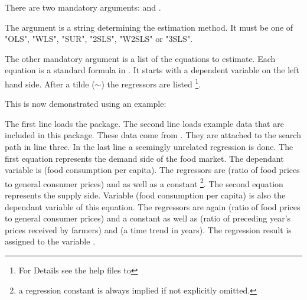 \documentclass[article]{jss}
\begin{document}
There are two mandatory arguments:  and .

The argument  is a string determining the estimation method.
It must be one of "OLS", "WLS", "SUR", "2SLS", "W2SLS" or "3SLS".

The other mandatory argument  is a list of the equations 
to estimate. 
Each equation is a standard formula in .
It starts with a dependent variable on the left hand side.
After a tilde ($\sim$) the regressors are listed%
\footnote{For Details see the  help files to }.

This is now demonstrated using an example: \\

The first line loads the  package. 
The second line loads example data that are included in this package.
These data come from \cite{kmenta86}.
They are attached to the  search path in line three.
In the last line a seemingly unrelated regression is done.
The first equation represents the demand side of the food market.
The dependant variable is  (food consumption per capita). 
The regressors are  (ratio of food prices to general consumer prices)
and  as well as a constant%
\footnote{a regression constant is always implied if not explicitly omitted.}.
The second equation represents the supply side.
Variable  (food consumption per capita) is also the dependant 
variable of this equation. 
The regressors are again  (ratio of food prices to general 
consumer prices) and a constant as well as 
 (ratio of preceding year's prices received by farmers) and 
 (a time trend in years).
The regression result is assigned to the variable .
\end{document}
